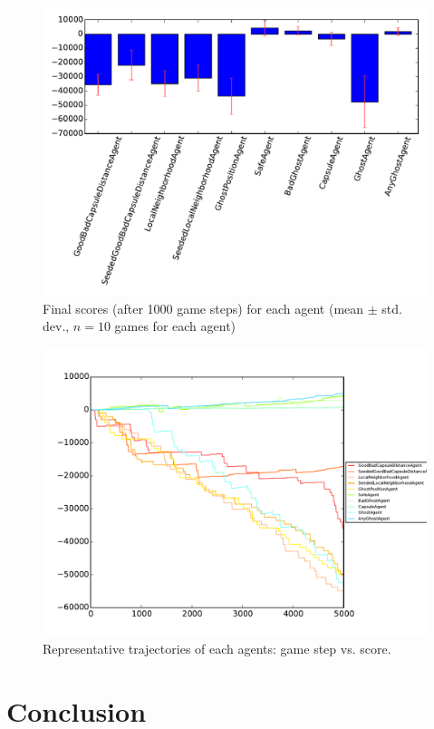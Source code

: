 \documentclass[11pt]{amsart}
\begin{document}
\begin{figure}
	\includegraphics[width=\textwidth]{agents-finals.pdf}
	\caption{Final scores (after 1000 game steps) for each agent (mean $\pm$ std. dev., $n = 10$ games for each agent)}
\end{figure}

\begin{figure}
	\includegraphics[width=\textwidth]{agents-trajectories.pdf}
	\caption{Representative trajectories of each agents: game step vs. score.}
\end{figure}


\section{Conclusion}
\end{document}
